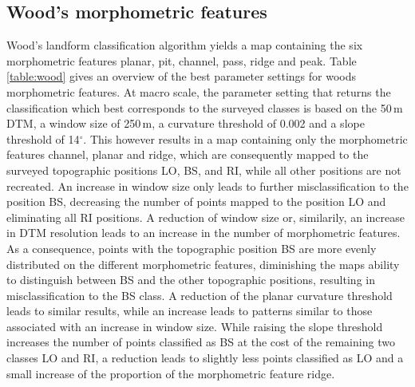 \documentclass[preprint,12pt,authoryear]{elsarticle}
\begin{document}
\subsection{Wood's morphometric features}
Wood's landform classification algorithm yields a map containing the six morphometric features planar, pit, channel, pass, ridge and peak. Table\,\ref{table:wood} gives an overview of the best parameter settings for woods morphometric features.
At macro scale, the parameter setting that returns the classification which best corresponds to the surveyed classes is based on the 50\,m DTM, a window size of 250\,m, a curvature threshold of 0.002 and a slope threshold of 14$^{\circ}$. This however results in a map containing only the morphometric features channel, planar and ridge, which are consequently mapped to the surveyed topographic positions LO, BS, and RI, while all other positions are not recreated. An increase in window size only leads to further misclassification to the position BS, decreasing the number of points mapped to the position LO and eliminating all RI positions. A reduction of window size or, similarily, an increase in DTM resolution leads to an increase in the number of morphometric features. As a consequence, points with the topographic position BS are more evenly distributed on the different morphometric features, diminishing the maps ability to distinguish between BS and the other topographic positions, resulting in misclassification to the BS class. A reduction of the planar curvature threshold leads to similar results, while an increase leads to patterns similar to those associated with an increase in window size. While raising the slope threshold increases the number of points classified as BS at the cost of the remaining two classes LO and RI, a reduction leads to slightly less points classified as LO and a small increase of the proportion of the morphometric feature ridge. 
\end{document}
